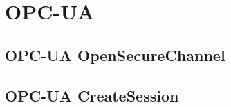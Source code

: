 \documentclass[a4paper]{article}
\newcommand{\opcua}{OPC-UA\xspace}
\begin{document}
\section{\opcua}\label{sec:opcua}
\subsection{\opcua OpenSecureChannel}


\subsection{\opcua CreateSession}


%
%



\end{document}

